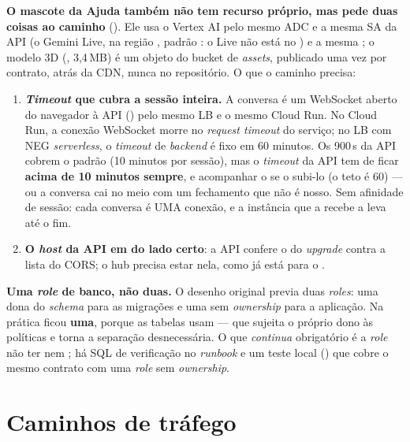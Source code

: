 \begin{atencao}
\textbf{O mascote da Ajuda também não tem recurso próprio, mas pede duas coisas
ao caminho} (). Ele usa o Vertex AI pelo mesmo ADC e a mesma SA da
API (o Gemini Live, na região , padrão
: o Live não está no ) e a mesma
; o modelo 3D
(, 3,4\,MB) é um objeto do bucket de
\emph{assets}, publicado uma vez por contrato, atrás da CDN, nunca no
repositório. O que o caminho precisa:
\begin{enumerate}
  \item \textbf{\emph{Timeout} que cubra a sessão inteira.} A conversa é um
    WebSocket aberto do navegador à API () pelo
    mesmo LB e o mesmo Cloud Run. No Cloud Run, a conexão WebSocket morre no
    \emph{request timeout} do serviço; no LB com NEG \emph{serverless}, o
    \emph{timeout} de \emph{backend} é fixo em 60 minutos. Os 900\,s da API
    cobrem o padrão (10 minutos por sessão), mas o \emph{timeout} da API tem de
    ficar \textbf{acima de 10 minutos sempre}, e acompanhar o
     se o  subi-lo (o teto é 60) --- ou a
    conversa cai no meio com um fechamento que não é nosso. Sem afinidade de
    sessão: cada conversa é UMA conexão, e a instância que a recebe a leva até
    o fim.
  \item \textbf{O \emph{host} da API em  do lado certo}: a
    API confere o  do \emph{upgrade} contra a lista do CORS; o hub
    precisa estar nela, como já está para o .
\end{enumerate}
\end{atencao}

\begin{decisao}
\textbf{Uma \emph{role} de banco, não duas.} O desenho original previa duas
\emph{roles}: uma dona do \emph{schema} para as migrações e uma 
sem \emph{ownership} para a aplicação. Na prática ficou \textbf{uma}, porque as
tabelas usam  --- que sujeita o próprio dono às
políticas e torna a separação desnecessária. O que \emph{continua} obrigatório é
a \emph{role} não ter  nem ; há SQL de verificação no
\emph{runbook} e um teste local () que cobre o mesmo
contrato com uma \emph{role} sem \emph{ownership}.
\end{decisao}

\section{Caminhos de tráfego}

